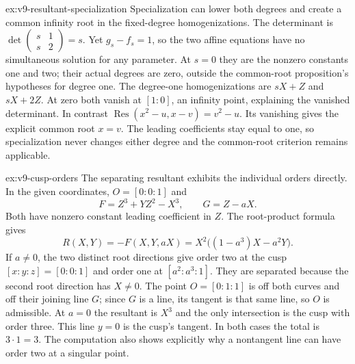 \begin{solution}{ex:v9-resultant-specialization}
\idea Specialization can lower both degrees and create a common infinity root in the fixed-degree homogenizations.
\writeup The determinant is $\det\left(\begin{smallmatrix}s&1\\s&2\end{smallmatrix}\right)=s$. Yet $g_s-f_s=1$, so the two affine equations have no simultaneous solution for any parameter. At $s=0$ they are the nonzero constants one and two; their actual degrees are zero, outside the common-root proposition's hypotheses for degree one. The degree-one homogenizations are $sX+Z$ and $sX+2Z$. At zero both vanish at $[1:0]$, an infinity point, explaining the vanished determinant. In contrast $\operatorname{Res}(x^2-u,x-v)=v^2-u$. Its vanishing gives the explicit common root $x=v$. The leading coefficients stay equal to one, so specialization never changes either degree and the common-root criterion remains applicable.
\end{solution}
\begin{solution}{ex:v9-cusp-orders}
\idea The separating resultant exhibits the individual orders directly.
\writeup In the given coordinates, $O=[0:0:1]$ and
\[
F=Z^3+YZ^2-X^3,\qquad G=Z-aX.
\]
Both have nonzero constant leading coefficient in $Z$. The root-product formula gives
\[
R(X,Y)=-F(X,Y,aX)
=X^2\bigl((1-a^3)X-a^2Y\bigr).
\]
If $a\ne0$, the two distinct root directions give order two at the cusp $[x:y:z]=[0:0:1]$ and order one at $[a^2:a^3:1]$. They are separated because the second root direction has $X\ne0$. The point $O=[0:1:1]$ is off both curves and off their joining line $G$; since $G$ is a line, its tangent is that same line, so $O$ is admissible. At $a=0$ the resultant is $X^3$ and the only intersection is the cusp with order three. This line $y=0$ is the cusp's tangent. In both cases the total is $3\cdot1=3$. The computation also shows explicitly why a nontangent line can have order two at a singular point.
\end{solution}
